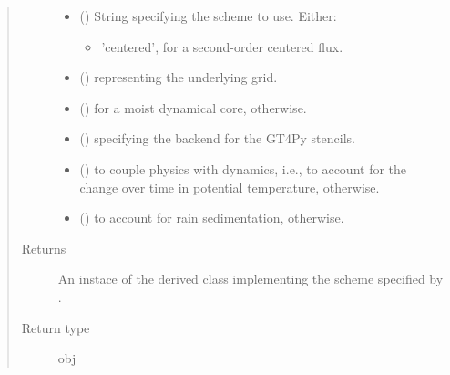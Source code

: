 \documentclass[letterpaper,10pt,english]{sphinxmanual}
\begin{document}
\begin{fulllineitems}
\begin{fulllineitems}
\begin{quote}
\begin{description}
\begin{itemize}
\begin{itemize}
\end{itemize}


\item {} 
 () \textendash{} 
String specifying the scheme to use. Either:
\begin{itemize}
\item {} 
’centered’, for a second-order centered flux.

\end{itemize}


\item {} 
 () \textendash{} {\hyperref[\detokenize{api:tasmania.grids.grid_xyz.GridXYZ}]{}} representing the underlying grid.

\item {} 
 () \textendash{}  for a moist dynamical core,  otherwise.

\item {} 
 () \textendash{}  specifying the backend for the GT4Py stencils.

\item {} 
 () \textendash{}  to couple physics with dynamics, i.e., to account for the change over time in potential temperature,
 otherwise.

\item {} 
 () \textendash{}  to account for rain sedimentation,  otherwise.

\end{itemize}

\item[{Returns}] \leavevmode
An instace of the derived class implementing the scheme specified by .

\item[{Return type}] \leavevmode
obj

\end{description}\end{quote}

\end{fulllineitems}


\end{fulllineitems}
\end{document}
